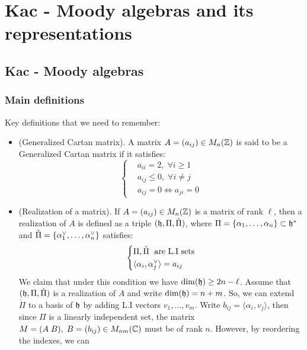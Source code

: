 \chapter{Kac - Moody algebras and its representations}

\section{Kac - Moody algebras}
\subsection{Main definitions}

Key definitions that we need to remember:

\begin{itemize}
    \item(Generalized Cartan matrix). A matrix $A=(a_{ij})\in M_n(\mathbb{Z})$ is said to be a Generalized Cartan matrix if it satisfies:
    \begin{equation}
        \left\{\begin{aligned}
            &a_{ii} = 2,\;\forall i\geq1\\
            &a_{ij} \leq 0,\;\forall i\neq j\\
            &a_{ij} = 0 \iff a_{ji} = 0
        \end{aligned}\right.
    \end{equation}
    \item(Realization of a matrix). If $A = (a_{ij})\in M_n(\mathbb{Z})$ is a matrix of rank $\ell$, then a realization of $A$ is defined as a triple 
    $(\mathfrak{h},\Pi,\check{\Pi})$, where $\Pi=\{\alpha_1,\dots,\alpha_n\}\subset\mathfrak{h}^*$ and 
    $\check{\Pi}=\{\alpha^{\vee}_1,\dots,\alpha^{\vee}_n\}$ satisfies:
    \begin{equation}
        \left\{\begin{aligned}
            &\Pi, \check{\Pi} \;\text{ are L.I sets}\\
            &\langle \alpha_i,\alpha^{\vee}_j \rangle = a_{ij}
        \end{aligned}\right.
    \end{equation} 
    We claim that under this condition we have $\dim(\mathfrak{h}) \geq 2n - \ell$. Assume that $(\mathfrak{h},\Pi,\check{\Pi})$ is a 
    realization of $A$ and write $\dim(\mathfrak{h})= n+m$. So, we can extend $\check{\Pi}$ to a basis of $\mathfrak{h}$ by adding 
    L.I vectors $v_1,\dots, v_m$. Write $b_{ij} = \langle\alpha_i,v_j\rangle$, then since $\Pi$ is a linearly independent 
    set, the matrix $ M = (A\;B),\;B=(b_{ij}) \in M_{nm}(\mathbb{C})$ must be of rank $n$. However, by reordering the indexes, we can 

\end{itemize}
